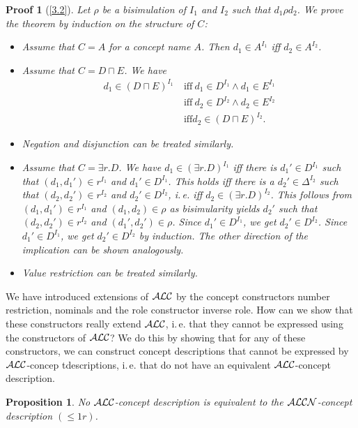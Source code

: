 \documentclass[openany]{scrbook}
\theoremstyle{break}
\newtheorem{Proposition}[Theorem]{Proposition}
\theoremstyle{nonumberbreak}
\theoremstyle{nonumberplain}
\theoremstyle{nonumberbreak}
\newtheorem{Proof}{Proof}
\newcommand{\ie}{i{.}\,e{.}\xspace}
\newcommand{\ALC}{{\cal A}{\cal L}{\cal C}}
\newcommand{\ALCN}{{\cal A}{\cal L}{\cal C}{\cal N}}
\begin{document}
\begin{Proof}[\cref{3.2}]
  Let $\rho$ be a bisimulation of $I_1$ and $I_2$ such that $d_1 \rho
  d_2$. We prove the theorem by induction on the structure of $C$:
  \begin{itemize}
  \item Assume that $C = A$ for a concept name $A$. Then $d_1 \in
    A^{I_1}$ iff $d_2 \in A^{I_2}$.
  \item Assume that $C = D \sqcap E$. We have
    \begin{align*}
      d_1 \in (D \sqcap E)^{I_1} & \ \text{iff}\ d_1 \in D^{I_1}
    \wedge d_1 \in E^{I_1} \\
    & \ \text{iff}\ d_2 \in D^{I_2} \wedge d_2 \in E^{I_2} \\
    & \ \text{iff} d_2 \in (D \sqcap E)^{I_2}.
    \end{align*}
  \item Negation and disjunction can be treated similarly.
  \item Assume that $C = \exists r.D$. We have $d_1 \in (\exists
    r.D)^{I_1}$ iff there is $d_1' \in D^{I_1}$ such that $(d_1, d_1')
    \in r^{I_1}$ and $d_1' \in D^{I_1}$. This holds iff there is a
    $d_2' \in \Delta^{I_2}$ such that $(d_2, d_2') \in r^{I_2}$ and
    $d_2' \in D^{I_2}$, \ie iff $d_2 \in (\exists r.D)^{I_2}$. This
    follows from $(d_1, d_1') \in r^{I_1}$ and $(d_1, d_2) \in \rho$
    as bisimularity yields $d_2'$ such that $(d_2, d_2') \in r^{I_2}$
    and $(d_1', d_2') \in \rho$. Since $d_1' \in D^{I_1}$, we get
    $d_2' \in D^{I_2}$. Since $d_1' \in D^{I_1}$, we get $d_2' \in
    D^{I_2}$ by induction. The other direction of the implication can
    be shown analogously.
  \item Value restriction can be treated similarly.
  \end{itemize}
\end{Proof}

We have introduced extensions of $\ALC$ by the concept constructors
number restriction, nominals and the role constructor inverse
role. How can we show that these constructors really extend $\ALC$,
\ie that they cannot be expressed using the constructors of $\ALC$? We
do this by showing that for any of these constructors, we can
construct concept descriptions that cannot be expressed by
$\ALC$-concep tdescriptions, \ie that do not have an equivalent
$\ALC$-concept description.

\begin{Proposition}
  \label{3.3}
  No $\ALC$-concept description is equivalent to the $\ALCN$-concept
  description $(\leq 1r)$.
\end{Proposition}
\end{document}
